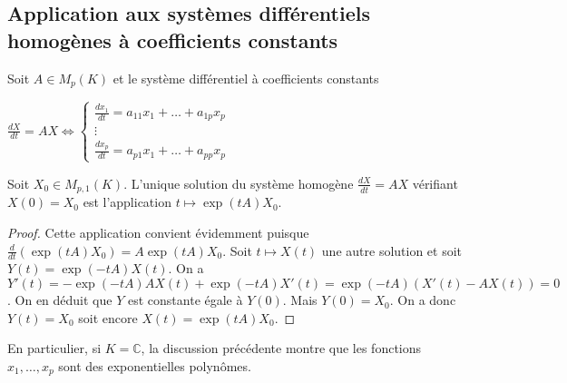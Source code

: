 \subsection{Application aux systèmes différentiels homogènes à coefficients constants}

Soit $A \in M_p(K)$ et le système différentiel à coefficients constants

$\frac{dX}{dt} = AX \Leftrightarrow \begin{cases} 
\frac{dx_1}{dt} = a_{11} x_1 + \ldots + a_{1p} x_p \\
\vdots \\
\frac{dx_p}{dt} = a_{p1} x_1 + \ldots + a_{pp} x_p 
\end{cases}$

\begin{thm}
Soit $X_0 \in M_{p,1}(K)$. L'unique solution du système homogène $\frac{dX}{dt} = AX$ vérifiant $X(0) = X_0$ est l'application $t \mapsto \exp(tA) X_0$.
\end{thm}

\begin{proof}
Cette application convient évidemment puisque $\frac{d}{dt}(\exp(tA)X_0) = A\exp(tA)X_0$. Soit $t \mapsto X(t)$ une autre solution et soit $Y(t) = \exp(-tA)X(t)$. On a $Y'(t) = -\exp(-tA)AX(t) + \exp(-tA)X'(t) = \exp(-tA)(X'(t) - AX(t)) = 0$. On en déduit que $Y$ est constante égale à $Y(0)$. Mais $Y(0) = X_0$. On a donc $Y(t) = X_0$ soit encore $X(t) = \exp(tA)X_0$.
\end{proof}

\begin{rem}
En particulier, si $K = \mathbb{C}$, la discussion précédente montre que les fonctions $x_1,\ldots,x_p$ sont des exponentielles polynômes.
\end{rem}

